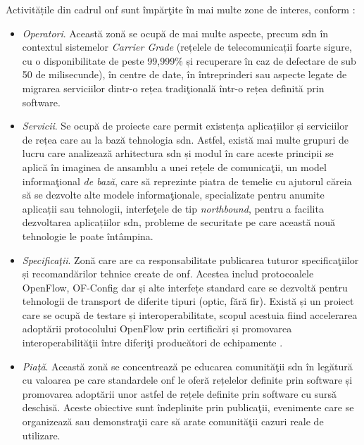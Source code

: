 Activitățile din cadrul \gls{onf} sunt împărţite în mai multe zone de interes, conform \cite{onftech}:
\begin{itemize}
	\item \textit{Operatori}. Această zonă se ocupă de mai multe aspecte, precum \gls{sdn} în contextul sistemelor \textit{Carrier Grade} (rețelele de telecomunicații foarte sigure, cu o disponibilitate de peste 99,999\% și recuperare în caz de defectare de sub 50 de milisecunde), în centre de date, în întreprinderi sau aspecte legate de migrarea serviciilor dintr-o rețea tradiţională într-o rețea definită prin software.
	\item \textit{Servicii}. Se ocupă de proiecte care permit existența aplicațiilor și serviciilor de rețea care au la bază tehnologia \gls{sdn}. Astfel, există mai multe grupuri de lucru care analizează arhitectura \gls{sdn} și modul în care aceste principii se aplică în imaginea de ansamblu a unei rețele de comunicaţii, un model informaţional \textit{de bază}, care să reprezinte piatra de temelie cu ajutorul căreia să se dezvolte alte modele informaţionale, specializate pentru anumite aplicații sau tehnologii, interfeţele de tip \textit{northbound}, pentru a facilita dezvoltarea aplicațiilor \gls{sdn}, probleme de securitate pe care această nouă tehnologie le poate întâmpina.  
	\item \textit{Specificaţii}. Zonă care are ca responsabilitate publicarea tuturor specificaţiilor și recomandărilor tehnice create de \gls{onf}. Acestea includ protocoalele OpenFlow, OF-Config dar și alte interfețe standard care se dezvoltă pentru tehnologii de transport de diferite tipuri (optic, fără fir). Există și un proiect care se ocupă de testare și interoperabilitate, scopul acestuia fiind accelerarea adoptării protocolului OpenFlow prin certificări și promovarea interoperabilităţii între diferiţi producători de echipamente \cite{onftr539}.
	\item \textit{Piaţă}. Această zonă se concentrează pe educarea comunităţii \gls{sdn} în legătură cu valoarea pe care standardele \gls{onf} le oferă rețelelor definite prin software și promovarea adoptării unor astfel de rețele definite prin software cu sursă deschisă. Aceste obiective sunt îndeplinite prin publicaţii, evenimente care se organizează sau demonstraţii care să arate comunităţii cazuri reale de utilizare.
\end{itemize}

